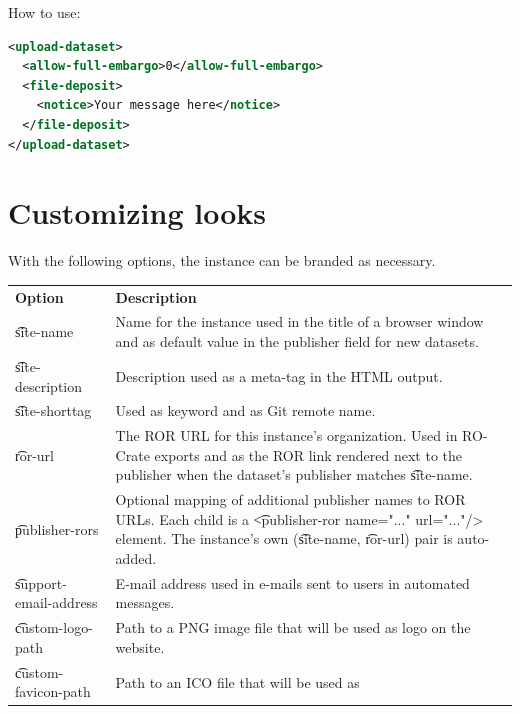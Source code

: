   How to use:

\begin{lstlisting}[language=xml]
<upload-dataset>
  <allow-full-embargo>0</allow-full-embargo>
  <file-deposit>
    <notice>Your message here</notice>
  </file-deposit>
</upload-dataset>
\end{lstlisting}

\section{Customizing looks}

  With the following options, the instance can be branded as necessary.

\begin{tabularx}{\textwidth}{*{1}{!{\VRule[-1pt]}l}!{\VRule[-1pt]}X}
  \headrow
  \textbf{Option}             & \textbf{Description}\\
  \t{site-name}               & Name for the instance used in the title of a
                                browser window and as default value in the
                                publisher field for new datasets.\\
  \t{site-description}        & Description used as a meta-tag in the HTML
                                output.\\
  \t{site-shorttag}           & Used as keyword and as Git remote name.\\
  \t{ror-url}                 & The ROR URL for this instance's organization.
                                Used in RO-Crate exports and as the ROR
                                link rendered next to the publisher when
                                the dataset's publisher matches \t{site-name}.\\
  \t{publisher-rors}          & Optional mapping of additional publisher
                                names to ROR URLs. Each child is a
                                \t{<publisher-ror name="..." url="..."/>}
                                element. The instance's own
                                (\t{site-name}, \t{ror-url}) pair is
                                auto-added.\\
  \t{support-email-address}   & E-mail address used in e-mails sent to users
                                in automated messages.\\
  \t{custom-logo-path}        & Path to a PNG image file that will be used as
                                logo on the website.\\
  \t{custom-favicon-path}     & Path to an ICO file that will be used as

\end{tabularx}
